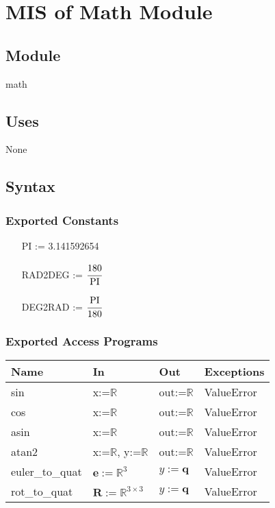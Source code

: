 \documentclass[12pt, titlepage]{article}
\begin{document}
\newpage

\section{MIS of Math Module} \label{mm}

\subsection{Module}
math

\subsection{Uses}
None

\subsection{Syntax}

\subsubsection{Exported Constants}
\begin{itemize}
  \item[PI] := 3.141592654
  \item[RAD2DEG] := $\cfrac{180}{\text{PI}}$
  \item[DEG2RAD] := $\cfrac{\text{PI}}{180}$
\end{itemize}


\subsubsection{Exported Access Programs}

\begin{center}
\begin{tabular}{p{2cm} p{4cm} p{4cm} p{2cm}}
\hline
\textbf{Name} & \textbf{In} & \textbf{Out} & \textbf{Exceptions} \\
\hline
sin & x:=$\mathbb{R}$ & out:=$\mathbb{R}$ & ValueError \\
cos & x:=$\mathbb{R}$ & out:=$\mathbb{R}$ & ValueError \\
asin & x:=$\mathbb{R}$ & out:=$\mathbb{R}$ & ValueError \\
atan2 & x:=$\mathbb{R}$, y:=$\mathbb{R}$ & out:=$\mathbb{R}$ & ValueError \\
euler\_to\_quat & $\mathbf{e}:=\mathbb{R}^3$& $y:=\mathbf{q}$ & ValueError \\
rot\_to\_quat & $\mathbf{R} := \mathbb{R}^{3 \times 3}$ & $y:=\mathbf{q}$ & ValueError \\
\hline
\end{tabular}
\end{center}
\end{document}
